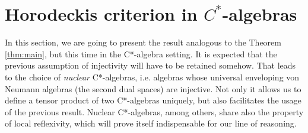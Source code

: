 
\section{Horodeckis criterion in $C^*$-algebras}
In this section, we are going to present the result
analogous to the Theorem \ref{thm:main}, but this time in the C*-algebra setting.
It is expected that the previous assumption of injectivity
will have to be retained somehow. That leads to the choice of \emph{nuclear} C*-algebras,
i.e. algebras whose universal enveloping von Neumann algebras (the second dual spaces) are
injective. Not only it allows us to define a tensor product of two C*-algebras
uniquely, but also facilitates the usage of the previous result.
Nuclear C*-algebras, among others, share also the property of
local reflexivity, which will prove itself indispensable for
our line of reasoning.


